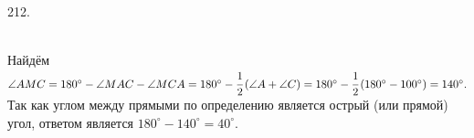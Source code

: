 212. \begin{figure}[ht!]
\end{figure}\\
Найдём $\angle AMC=180^\circ-\angle MAC-\angle MCA=180^\circ-\cfrac{1}{2}\left(\angle A +\angle C\right)=180^\circ-\cfrac{1}{2}\left(180^\circ-100^\circ\right)=140^\circ.$ Так как углом между прямыми по определению является острый (или прямой) угол, ответом является $180^\circ-140^\circ=40^\circ.$\\
